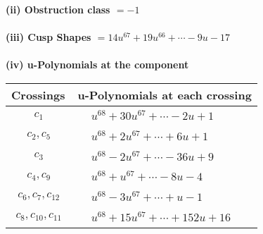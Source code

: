 \documentclass[1p]{elsarticle_modified}
\theoremstyle{definition}
\begin{document}
\flushleft \textbf{(ii) Obstruction class $= -1$}\\~\\
\flushleft \textbf{(iii) Cusp Shapes $= 14 u^{67}+19 u^{66}+\cdots-9 u-17$}\\~\\
\newpage\renewcommand{\arraystretch}{1}
\flushleft \textbf{(iv) u-Polynomials at the component}\newline \\
\begin{tabular}{m{50pt}|m{274pt}}
Crossings & \hspace{64pt}u-Polynomials at each crossing \\
\hline $$\begin{aligned}c_{1}\end{aligned}$$&$\begin{aligned}
&u^{68}+30 u^{67}+\cdots-2 u+1
\end{aligned}$\\
\hline $$\begin{aligned}c_{2},c_{5}\end{aligned}$$&$\begin{aligned}
&u^{68}+2 u^{67}+\cdots+6 u+1
\end{aligned}$\\
\hline $$\begin{aligned}c_{3}\end{aligned}$$&$\begin{aligned}
&u^{68}-2 u^{67}+\cdots-36 u+9
\end{aligned}$\\
\hline $$\begin{aligned}c_{4},c_{9}\end{aligned}$$&$\begin{aligned}
&u^{68}+u^{67}+\cdots-8 u-4
\end{aligned}$\\
\hline $$\begin{aligned}c_{6},c_{7},c_{12}\end{aligned}$$&$\begin{aligned}
&u^{68}-3 u^{67}+\cdots+u-1
\end{aligned}$\\
\hline $$\begin{aligned}c_{8},c_{10},c_{11}\end{aligned}$$&$\begin{aligned}
&u^{68}+15 u^{67}+\cdots+152 u+16
\end{aligned}$\\
\hline
\end{tabular}\\~\\
\end{document}
